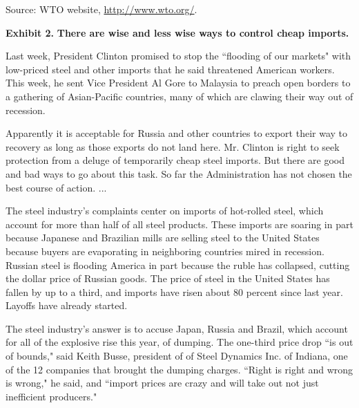 \documentclass[letterpaper,12pt]{article}
\begin{document}
Source:  WTO website, 
\href{http://www.wto.org/}{http://www.wto.org/}.

\pagebreak%
{\bf Exhibit 2.} {\bf There are wise and less wise ways to control cheap imports.} 

Last week, President Clinton promised to stop the ``flooding of our markets" with low-priced steel and other imports that he said threatened American workers. This week, he sent Vice President Al Gore to Malaysia to preach open borders to a gathering of Asian-Pacific countries, many of which are clawing their way out of recession.

Apparently it is acceptable for Russia and other countries to export their way to recovery as long as those exports do not land here. Mr. Clinton is right to seek protection from a deluge of temporarily cheap steel imports. But there are good and bad ways to go about this task. So far the Administration has not chosen the best course of action. ...

\begin{comment}
American steel manufacturers have accused Japan, Russia and Brazil of ``dumping" steel in the United States, or selling it for less than it costs them to make it at home. But anti-dumping rules too often amount to protectionism, shutting out legitimate exports and provoking trading partners to retaliate. The better course would be for the Administration to exploit a different provision of international trade rules, known as the safeguard clause, which permits countries to impose quotas or tariffs in order to block a sudden rush of cheap imports. That would give the United States a principled and constructive way to insulate workers from the temporary ravages of trade.
\end{comment}

The steel industry's complaints center on imports of hot-rolled steel, which account for more than half of all steel products. These imports are soaring in part because Japanese and Brazilian mills are selling steel to the United States because buyers are evaporating in neighboring countries mired in recession. Russian steel is flooding America in part because the ruble has collapsed, cutting the dollar price of Russian goods. The price of steel in the United States has fallen by up to a third, and imports have risen about 80 percent since last year. Layoffs have already started.

The steel industry's answer is to accuse Japan, Russia and Brazil, which account for all of the explosive rise this year, of dumping. The one-third price drop ``is out of bounds," said Keith Busse, president of of Steel Dynamics Inc. of Indiana, one of the 12 companies that brought the dumping charges. ``Right is right and wrong is wrong," he said, and ``import prices are crazy and will take out not just inefficient producers."
\end{document}
